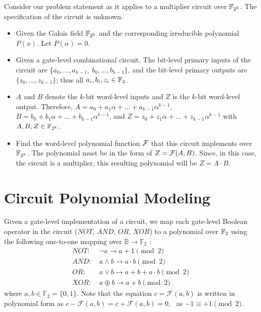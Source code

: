 \begin{Example}
Consider our problem statement as it applies to a multiplier 
circuit over ${\mathbb{F}}_{2^k}$. The specification of the circuit is unknown.
\begin{itemize}

\item Given the Galois field ${\mathbb{F}}_{2^k}$ and the corresponding
  irreducible polynomial $P(x)$. Let $P(\alpha) = 0$.

\item  Given a gate-level combinational circuit. The bit-level primary
  inputs of the circuit are $\{a_0, \dots, a_{k-1}, ~b_0, 
  \dots, b_{k-1}\}$, and the bit-level primary outputs are 
$\{z_0, \dots, z_{k-1}\}$; thus all $a_i, b_i, z_i \in {\mathbb{F}}_2$.

\item $A$ and $B$ denote the $k$-bit word-level inputs and $Z$ is the
$k$-bit word-level output. Therefore, 
$A = a_0 + a_1\alpha + \dots + a_{k-1}\alpha^{k-1}$,
$B = b_0 + b_1\alpha + \dots + b_{k-1}\alpha^{k-1}$, and 
$Z = z_0 + z_1\alpha + \dots + z_{k-1}\alpha^{k-1}$ with $A,B,Z \in {\mathbb{F}}_{2^k}$.

\item Find the word-level polynomial function ${\mathcal{F}}$ that this circuit 
implements over ${\mathbb{F}}_{2^k}$.
The polynomial must be in the form of $Z={\mathcal{F}}(A,B)$. Since, in this case, 
the circuit is a multiplier, this resulting polynomial will be $Z=A\cdot B$.

\end{itemize}
\end{Example}

\section{Circuit Polynomial Modeling}

Given a gate-level implementation of a circuit,
we map each gate-level
Boolean operator in the circuit ($NOT$, $AND$, $OR$, $XOR$) to a polynomial 
over ${\mathbb{F}}_2$ using the following
one-to-one mapping over $\mathbb{B} \rightarrow \mathbb{F}_2$ : 
\begin{equation}
\label{b2poly}
\begin{split}
NOT :&~\neg a \rightarrow a+1 \pmod 2  \\   
AND :&~a \wedge b \rightarrow a\cdot b \pmod 2  \\ 
OR :&~a \vee b \rightarrow a+b+a\cdot b \pmod 2  \\
XOR :&~a \oplus b \rightarrow a+b \pmod 2 
\end{split}
\end{equation}
where $a,b \in \mathbb{F}_{2}=\{0,1\}$.
Note that the equation $c=\mathcal{F}(a,b)$ is written in polynomial
form as $c-\mathcal{F}(a,b)=c+\mathcal{F}(a,b)=0$, ~as $-1 \equiv +1
\pmod 2$.

